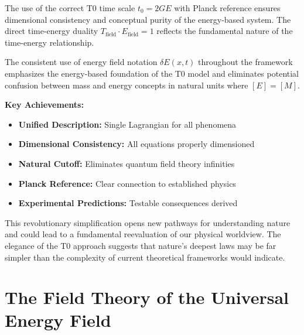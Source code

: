 \documentclass[12pt,a4paper]{report}
\newcommand{\tzero}{t_0}                  %
\begin{document}
	The use of the correct T0 time scale $\tzero = 2GE$ with Planck reference ensures dimensional consistency and conceptual purity of the energy-based system. The direct time-energy duality $T_{\text{field}} \cdot E_{\text{field}} = 1$ reflects the fundamental nature of the time-energy relationship.
	
	The consistent use of energy field notation $\delta E(x,t)$ throughout the framework emphasizes the energy-based foundation of the T0 model and eliminates potential confusion between mass and energy concepts in natural units where $[E] = [M]$.
	
	\textbf{Key Achievements:}
	\begin{itemize}
		\item \textbf{Unified Description:} Single Lagrangian for all phenomena
		\item \textbf{Dimensional Consistency:} All equations properly dimensioned
		\item \textbf{Natural Cutoff:} Eliminates quantum field theory infinities
		\item \textbf{Planck Reference:} Clear connection to established physics
		\item \textbf{Experimental Predictions:} Testable consequences derived
	\end{itemize}
	
	This revolutionary simplification opens new pathways for understanding nature and could lead to a fundamental reevaluation of our physical worldview. The elegance of the T0 approach suggests that nature's deepest laws may be far simpler than the complexity of current theoretical frameworks would indicate.
	\chapter{The Field Theory of the Universal Energy Field}
	\label{chap:universal_field_theory}
	
\end{document}
